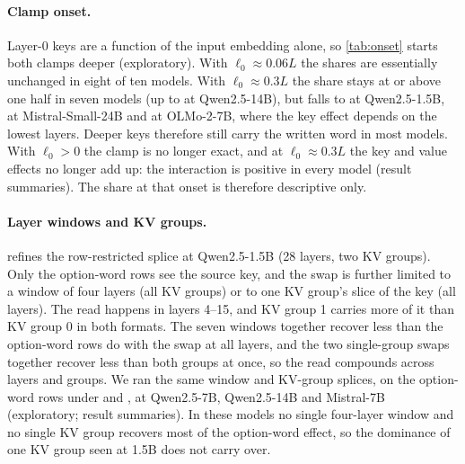 \paragraph{Clamp onset.} Layer-0 keys are a function of the input embedding alone, so \cref{tab:onset} starts both clamps deeper (exploratory). With $\ell_0 \approx 0.06L$ the shares are essentially unchanged in eight of ten models. With $\ell_0 \approx 0.3L$ the share stays at or above one half in seven models (up to \onsetLateQwenFourteen{} at Qwen2.5-14B), but falls to \onsetLateQwenOnefive{} at Qwen2.5-1.5B, \onsetLateMistralTwentyfour{} at Mistral-Small-24B and \onsetLateOlmoSeven{} at OLMo-2-7B, where the key effect depends on the lowest layers. Deeper keys therefore still carry the written word in most models. With $\ell_0 > 0$ the clamp is no longer exact, and at $\ell_0 \approx 0.3L$ the key and value effects no longer add up: the interaction is positive in every model (result summaries). The share at that onset is therefore descriptive only.

\begin{table}[!ht]
\centering
\caption{\textbf{Key share by clamp onset.} $s_K = \bar d_K / (\bar d_K + \bar d_V)$ under \fmtOpt{} with both clamps applied from layer $\ell_0$ on; the onset used in each model is given in brackets. $n = 150$ stories per model; point estimates (the $\ell_0 = 0$ intervals are in \cref{tab:natural}). Exploratory.}
\label{tab:onset}

\end{table}

\paragraph{Layer windows and KV groups.}  refines the row-restricted splice at Qwen2.5-1.5B (28 layers, two KV groups). Only the option-word rows see the source key, and the swap is further limited to a window of four layers (all KV groups) or to one KV group's slice of the key (all layers). The read happens in layers 4--15, and KV group 1 carries more of it than KV group 0 in both formats. The seven windows together recover less than the option-word rows do with the swap at all layers, and the two single-group swaps together recover less than both groups at once, so the read compounds across layers and groups. We ran the same window and KV-group splices, on the option-word rows under \fmtOpt{} and \fmtLetter{}, at Qwen2.5-7B, Qwen2.5-14B and Mistral-7B (exploratory; result summaries). In these models no single four-layer window and no single KV group recovers most of the option-word effect, so the dominance of one KV group seen at 1.5B does not carry over.

